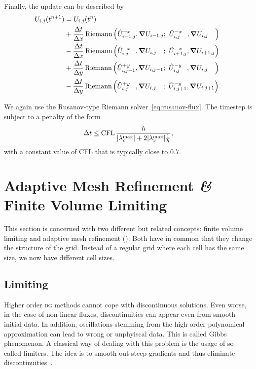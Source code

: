 Finally, the update can be described by
\begin{align}
  \begin{split}
    \cellAvg (t^{n+1}) &= \cellAvg (t^n)
    \\ &+
  \frac{\Delta t}{\Delta x}
    \Riemann \left(
      \evolvedCellAvg[i-1,j]{+x}, \gradCellAvg[i-1,j]; \ %
      \evolvedCellAvg[i,j\phantom{-1}]{-x}, \gradCellAvg[i,j\phantom{-1}]
    \right)
    \\ &-
  \frac{\Delta t}{\Delta x}
    \Riemann \left(
      \evolvedCellAvg[i,j\phantom{+1}]{+x}, \gradCellAvg[i,j\phantom{+1}]; \ %
      \evolvedCellAvg[i+1,j]{-x}, \gradCellAvg[i+1,j]
    \right)
    \\ &+
  \frac{\Delta t}{\Delta y}
    \Riemann \left(
      \evolvedCellAvg[i,j-1]{+y}, \gradCellAvg[i,j-1]; \ %
      \evolvedCellAvg[i,j\phantom{-1}]{-y}, \gradCellAvg[i,j\phantom{-1}]
    \right)
    \\ &-
  \frac{\Delta t}{\Delta y}
    \Riemann \left(
      \evolvedCellAvg[i,j\phantom{+1}]{+y}, \gradCellAvg[i,j\phantom{+1}]; \ %
      \evolvedCellAvg[i,j+1]{-y}, \gradCellAvg[i,j+1]
    \right).
  \end{split}
\end{align}

We again use the Rusanov-type Riemann solver~\cref{eq:rusanov-flux}.
The timestep is subject to a penalty of the form
\begin{equation}\label{eq:cfl-muscl}
 \Delta t \leq  \text{CFL} \, \frac{h}{\maxConvEigen + 2 \maxViscEigen \frac{1}{h}},
\end{equation}
with a constant value of CFL that is typically close to $0.7$.

\section{Adaptive Mesh Refinement \textit{\&} Finite Volume Limiting}\label{sec:grid}
This section is concerned with two different but related concepts:%
finite volume limiting and adaptive mesh refinement (\amr{}).
Both have in common that they change the structure of the grid.
Instead of a regular grid where each cell has the same size, we now have different cell sizes.

\subsection{Limiting}\label{sec:limiting}
Higher order \textsc{dg} methods cannot cope with discontinuous solutions.
Even worse, in the case of non-linear fluxes, discontinuities can appear even from smooth initial data.
In addition, oscillations stemming from the high-order polynomical approximation can lead to wrong or unphyiscal data.
This is called Gibbs phenomenon.
A classical way of dealing with this problem is the usage of so called limiters.
The idea is to smooth out steep gradients and thus eliminate discontinuities~\cite{hesthaven2008nodal}.

